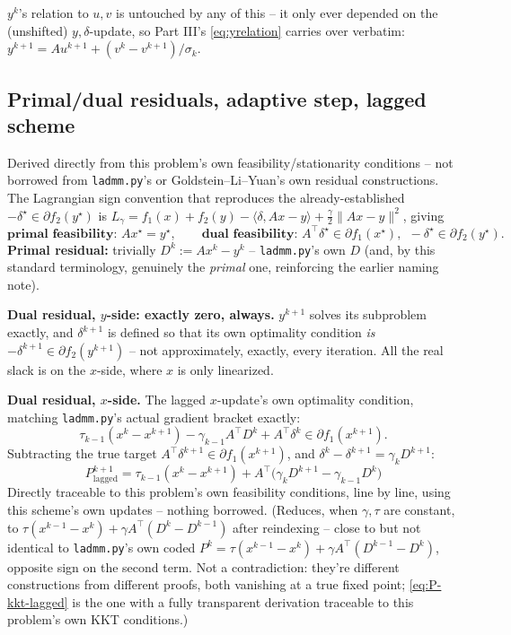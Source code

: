 \documentclass[11pt]{article}
\newcommand{\code}[1]{\texttt{#1}}
\begin{document}
$y^k$'s relation to $u,v$ is untouched by any of this -- it only ever depended on the
(unshifted) $y,\delta$-update, so Part III's \eqref{eq:yrelation} carries over verbatim:
$y^{k+1}=Au^{k+1}+(v^k-v^{k+1})/\sigma_k$.

\subsection*{Primal/dual residuals, adaptive step, lagged scheme}
Derived directly from this problem's own feasibility/stationarity conditions -- not
borrowed from \code{ladmm.py}'s or Goldstein--Li--Yuan's own residual constructions.
The Lagrangian sign convention that reproduces the already-established
$-\delta^\star\in\partial f_2(y^\star)$ is
$L_\gamma=f_1(x)+f_2(y)-\langle\delta,Ax-y\rangle+\tfrac\gamma2\|Ax-y\|^2$, giving
\[
\textbf{primal feasibility: } Ax^\star=y^\star, \qquad
\textbf{dual feasibility: } A^\top\delta^\star\in\partial f_1(x^\star),\ \
-\delta^\star\in\partial f_2(y^\star).
\]
\textbf{Primal residual:} trivially $D^k:=Ax^k-y^k$ -- \code{ladmm.py}'s own $D$ (and,
by this standard terminology, genuinely the \emph{primal} one, reinforcing the earlier
naming note).

\textbf{Dual residual, $y$-side: exactly zero, always.} $y^{k+1}$ solves its
subproblem exactly, and $\delta^{k+1}$ is defined so that its own optimality condition
\emph{is} $-\delta^{k+1}\in\partial f_2(y^{k+1})$ -- not approximately, exactly, every
iteration. All the real slack is on the $x$-side, where $x$ is only linearized.

\textbf{Dual residual, $x$-side.} The lagged $x$-update's own optimality condition,
matching \code{ladmm.py}'s actual gradient bracket exactly:
\[
\tau_{k-1}(x^k-x^{k+1}) - \gamma_{k-1}A^\top D^k + A^\top\delta^k \in \partial f_1(x^{k+1}).
\]
Subtracting the true target $A^\top\delta^{k+1}\in\partial f_1(x^{k+1})$, and
$\delta^k-\delta^{k+1}=\gamma_kD^{k+1}$:
\begin{equation}
\boxed{P^{k+1}_{\mathrm{lagged}} = \tau_{k-1}(x^k-x^{k+1}) + A^\top\big(\gamma_kD^{k+1}-\gamma_{k-1}D^k\big)} \label{eq:P-kkt-lagged}
\end{equation}
Directly traceable to this problem's own feasibility conditions, line by line, using
this scheme's own updates -- nothing borrowed. (Reduces, when $\gamma,\tau$ are
constant, to $\tau(x^{k-1}-x^k)+\gamma A^\top(D^k-D^{k-1})$ after reindexing -- close to
but not identical to \code{ladmm.py}'s own coded $P^k=\tau(x^{k-1}-x^k)+\gamma
A^\top(D^{k-1}-D^k)$, opposite sign on the second term. Not a contradiction: they're
different constructions from different proofs, both vanishing at a true fixed point;
\eqref{eq:P-kkt-lagged} is the one with a fully transparent derivation traceable to
this problem's own KKT conditions.)
\end{document}
